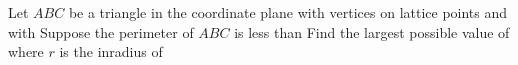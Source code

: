 Let $ABC$ be a triangle in the coordinate plane with vertices on lattice points and with   Suppose the perimeter of $ABC$ is less than   Find the largest possible value of  where $r$ is the inradius of 